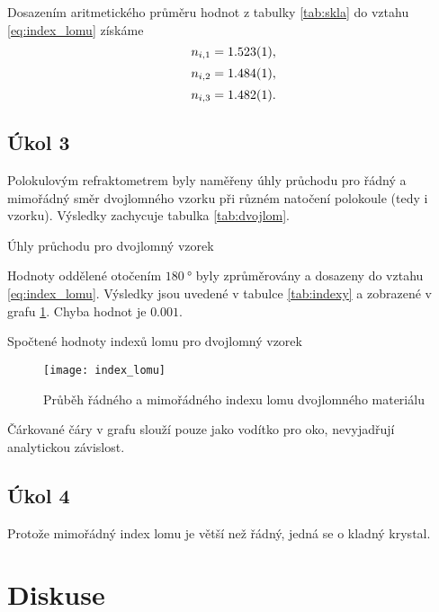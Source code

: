 \documentclass{protokol}
\begin{document}
      Dosazením aritmetického průměru hodnot z tabulky \ref{tab:skla} do vztahu \eqref{eq:index_lomu} získáme 
      $$ n_{i,1} = \SI{1.523 \pm 0.001}{}, $$
      $$ n_{i,2} = \SI{1.484 \pm 0.001}{}, $$
      $$ n_{i,3} = \SI{1.482 \pm 0.001}{}. $$

    \subsection*{Úkol 3}

      Polokulovým refraktometrem byly naměřeny úhly průchodu pro řádný a mimořádný směr dvojlomného vzorku při různém natočení polokoule (tedy i vzorku). Výsledky zachycuje tabulka \ref{tab:dvojlom}.

      \begin{table}[H]
        \centering
        \setlength{\tabcolsep}{10pt}
        
        \caption{Úhly průchodu pro dvojlomný vzorek}
        \label{tab:dvojlom}
      \end{table}

      Hodnoty oddělené otočením $\SI{180}{\degree}$ byly zprůměrovány a dosazeny do vztahu \eqref{eq:index_lomu}. Výsledky jsou uvedené v tabulce \ref{tab:indexy} a zobrazené v grafu \ref{fig:index_lomu}. Chyba hodnot je $\num{0.001}$.

      \begin{table}[H]
        \centering
        \setlength{\tabcolsep}{10pt}
        
        \caption{Spočtené hodnoty indexů lomu pro dvojlomný vzorek}
        \label{tab:indexy}
      \end{table}

      \begin{figure}[H]
        \centering
        \texttt{[image: index\_lomu]}
        \caption{Průběh řádného a mimořádného indexu lomu dvojlomného materiálu}
        \label{fig:index_lomu}
      \end{figure}

      Čárkované čáry v grafu slouží pouze jako vodítko pro oko, nevyjadřují analytickou závislost.

      \subsection*{Úkol 4}

        Protože mimořádný index lomu je větší než řádný, jedná se o kladný krystal.

  \section*{Diskuse}
\end{document}

